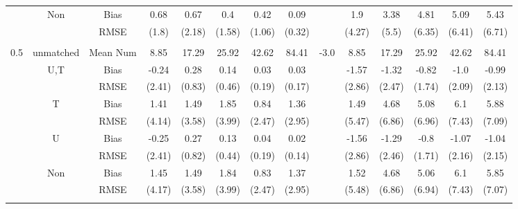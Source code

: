 \begin{tabular}{@{\extracolsep{5pt}}lc|cccccc|lccccc}
 & Non & Bias & 0.68 & 0.67 & 0.4 & 0.42 & 0.09 &  & 1.9 & 3.38 & 4.81 & 5.09 & 5.43 \\
 &  & RMSE & (1.8) & (2.18) & (1.58) & (1.06) & (0.32) &  & (4.27) & (5.5) & (6.35) & (6.41) & (6.71) \\
 &  &  &  &  &  &  &  &  &  &  &  &  &  \\
0.5 & unmatched & Mean Num & 8.85 & 17.29 & 25.92 & 42.62 & 84.41 & -3.0 & 8.85 & 17.29 & 25.92 & 42.62 & 84.41 \\
 & U,T & Bias & -0.24 & 0.28 & 0.14 & 0.03 & 0.03 &  & -1.57 & -1.32 & -0.82 & -1.0 & -0.99 \\
 &  & RMSE & (2.41) & (0.83) & (0.46) & (0.19) & (0.17) &  & (2.86) & (2.47) & (1.74) & (2.09) & (2.13) \\
 & T & Bias & 1.41 & 1.49 & 1.85 & 0.84 & 1.36 &  & 1.49 & 4.68 & 5.08 & 6.1 & 5.88 \\
 &  & RMSE & (4.14) & (3.58) & (3.99) & (2.47) & (2.95) &  & (5.47) & (6.86) & (6.96) & (7.43) & (7.09) \\
 & U & Bias & -0.25 & 0.27 & 0.13 & 0.04 & 0.02 &  & -1.56 & -1.29 & -0.8 & -1.07 & -1.04 \\
 &  & RMSE & (2.41) & (0.82) & (0.44) & (0.19) & (0.14) &  & (2.86) & (2.46) & (1.71) & (2.16) & (2.15) \\
 & Non & Bias & 1.45 & 1.49 & 1.84 & 0.83 & 1.37 &  & 1.52 & 4.68 & 5.06 & 6.1 & 5.85 \\
 &  & RMSE & (4.17) & (3.58) & (3.99) & (2.47) & (2.95) &  & (5.48) & (6.86) & (6.94) & (7.43) & (7.07) \\
 &  &  &  &  &  &  &  &  &  &  &  &  &  \\
\hline 
\bottomrule 
\end{tabular}
